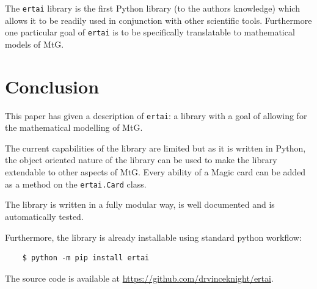 \documentclass{article}
\begin{document}
The \texttt{ertai} library is the first Python library (to the
authors knowledge) which allows it to be readily used in conjunction with other
scientific tools. Furthermore one particular goal of \texttt{ertai}
is to be specifically translatable to mathematical models of MtG.

\section{Conclusion}

This paper has given a description of \texttt{ertai}: a library with
a goal of allowing for the mathematical modelling of MtG.

The current capabilities of the library are limited but as it is written in
Python, the object oriented nature of the library can be used to make the
library extendable to other aspects of MtG. Every ability of a Magic card can be
added as a method on the \texttt{ertai.Card} class.

The library is written in a fully modular way, is well documented and is
automatically tested.

Furthermore, the library is already installable using standard python workflow:

\begin{verbatim}
    $ python -m pip install ertai
\end{verbatim}

The source code is available at \url{https://github.com/drvinceknight/ertai}.



\end{document}
